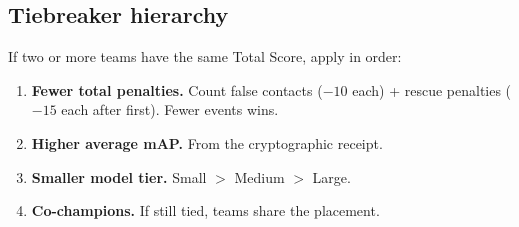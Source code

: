 \documentclass[a4]{article}
\begin{document}
\subsection*{Tiebreaker hierarchy}

If two or more teams have the same Total Score, apply in order:
\begin{enumerate}
    \item \textbf{Fewer total penalties.} Count false contacts ($-10$ each) + rescue penalties ($-15$ each after first). Fewer events wins.
    \item \textbf{Higher average mAP.} From the cryptographic receipt.
    \item \textbf{Smaller model tier.} Small $>$ Medium $>$ Large.
    \item \textbf{Co-champions.} If still tied, teams share the placement.
\end{enumerate}
\end{document}

